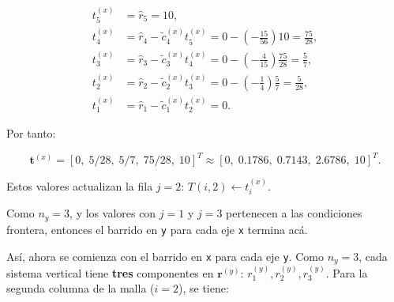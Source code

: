 \documentclass[11pt,a4paper]{article}
\begin{document}
\begin{equation}
\begin{aligned}
t_5^{(x)} &= \hat r_5 = 10,\\
t_4^{(x)} &= \hat r_4-\tilde c_4^{(x)}t_5^{(x)}
=0-\left(-\frac{15}{56}\right)10=\frac{75}{28},\\
t_3^{(x)} &= \hat r_3-\tilde c_3^{(x)}t_4^{(x)}
=0-\left(-\frac{4}{15}\right)\frac{75}{28}=\frac{5}{7},\\
t_2^{(x)} &= \hat r_2-\tilde c_2^{(x)}t_3^{(x)}
=0-\left(-\frac14\right)\frac57=\frac{5}{28},\\
t_1^{(x)} &= \hat r_1-\tilde c_1^{(x)}t_2^{(x)}=0.
\end{aligned}
\end{equation}

Por tanto:

\begin{equation}
\mathbf{t}^{(x)} = [0,\;5/28,\;5/7,\;75/28,\;10]^T
\approx [0,\;0.1786,\;0.7143,\;2.6786,\;10]^T.
\end{equation}

Estos valores actualizan la fila \(j=2\): \textbf{\(T(i,2)\leftarrow t^{(x)}_i\)}. 

\medskip

Como \(n_y=3\), y los valores con $j = 1$ y $j = 3$ pertenecen a las condiciones
frontera, entonces el barrido en \texttt{y} para cada eje \texttt{x} termina ac\'a.

\medskip

As\'i, ahora se comienza con el barrido en \texttt{x} para cada eje \texttt{y}.
Como \(n_y=3\), cada sistema vertical tiene \textbf{tres} componentes en
\(\mathbf r^{(y)}\): \(r_1^{(y)}, r_2^{(y)}, r_3^{(y)}\). Para la segunda
columna de la malla (\(i=2\)), se tiene:
\end{document}

